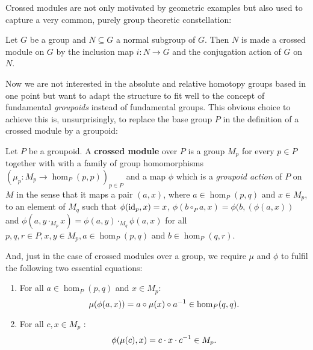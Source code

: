 Crossed modules are not only motivated by geometric examples but also used to
capture a very common, purely group theoretic constellation:

\begin{example}
Let $G$ be a group and $N \subseteq G$ a normal subgroup of $G$. Then $N$ is made a
crossed module on $G$ by the inclusion map $i : N \to G$ and the conjugation action
of $G$ on $N$.
\end{example}

Now we are not interested in the absolute and relative homotopy groups based in
one point but want to adapt the structure to fit well to the concept of fundamental
\emph{groupoids} instead of fundamental groups.
This obvious choice to achieve this is, unsurprisingly, to replace the base group $P$ in
the definition of a crossed module by a groupoid:

\begin{defn} \label{def:xmod-gpd}
Let $P$ be a groupoid.
A \textbf{crossed module} over $P$ is a group $M_p$
for every $p \in P$ together with
with a family of group homomorphisms $(\mu_p : M_p \to \hom_P(p,p))_{p \in P}$
and a map $\phi$ which is a \emph{groupoid action} of $P$ on $M$ in the sense that
it maps a pair $(a,x)$, where $a \in \hom_P(p,q)$ and $x \in M_p$, to an element
of $M_q$ such that $\phi(\operatorname{id}_p,x) = x$, $\phi(b \circ_P a, x) = \phi(b,(\phi(a,x))$
and $\phi(a, y \cdot_{M_p} x) = \phi(a,y) \cdot_{M_q} \phi(a,x)$ for all
$p, q, r \in P, x,y \in M_p, a \in \hom_P(p,q)$ and $b \in \hom_P(q,r)$.

And, just in the case of crossed modules over a group, we require $\mu$ and $\phi$
to fulfil the following two essential equations:
\begin{enumerate}
\item For all $a \in \hom_P(p,q)$ and $x \in M_p$:
\begin{equation} \label{eq:gp-CM1}
\mu(\phi(a,x)) = a \circ \mu(x) \circ a^{-1} \in \hom_P(q,q) \text{.}
\end{equation}
\item For all $c, x \in M_p$ :
\begin{equation} \label{eq:gp-CM2}
\phi(\mu(c),x) = c \cdot x \cdot c^{-1} \in M_p \text{.}
\end{equation}
\end{enumerate}
\end{defn}

